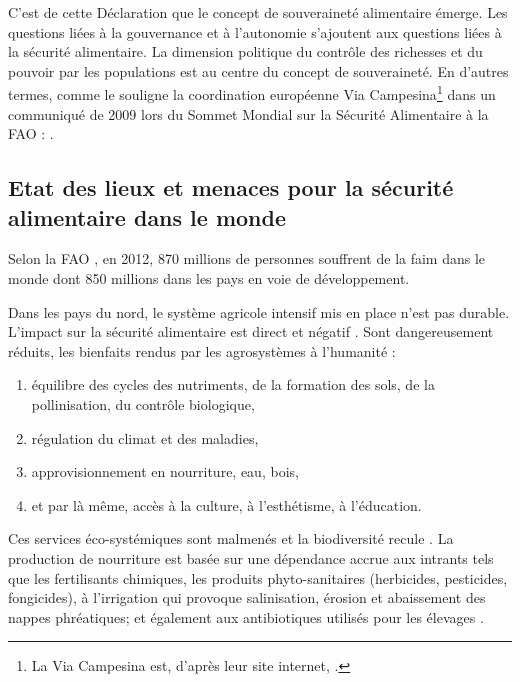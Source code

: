 C'est de cette Déclaration que le concept de souveraineté alimentaire émerge.
Les questions liées à la gouvernance et à l'autonomie s'ajoutent aux questions liées à la sécurité alimentaire.
La dimension politique du contrôle des richesses et du pouvoir par les populations est au centre du concept de souveraineté.
En d'autres termes, comme le souligne la coordination européenne Via Campesina\footnote{
La Via Campesina est, d'après leur site internet, .} dans un communiqué de 2009 lors du Sommet Mondial sur la Sécurité Alimentaire à la FAO :
.


\subsection{Etat des lieux et menaces pour la sécurité alimentaire dans le monde}
Selon la FAO \cite{fao_letat_2012}, en 2012, 870 millions de personnes souffrent de la faim dans le monde dont 850 millions dans les pays en voie de développement.

Dans les pays du nord, le système agricole intensif mis en place n'est pas durable.
L'impact sur la sécurité alimentaire est direct et négatif \cite{fao_biodiversity_2010,mea_ecosystems_2005,pimentel_environmental_2005,fao_statistical_2013,iaastd_agriculture_2008}.
Sont dangereusement réduits, les bienfaits rendus par les agrosystèmes à l'humanité : 
\begin{enumerate}
\item équilibre des cycles des nutriments, de la formation des sols, de la pollinisation, du contrôle biologique,
\item régulation du climat et des maladies,
\item approvisionnement en nourriture, eau, bois,
\item et par là même, accès à la culture, à l'esthétisme, à l'éducation. 
\end{enumerate}
Ces services éco-systémiques sont malmenés et la biodiversité recule \cite{mea_ecosystems_2005}.
La production de nourriture est basée sur une dépendance accrue aux intrants tels que les fertilisants chimiques, les produits phyto-sanitaires (herbicides, pesticides, fongicides), à l'irrigation qui provoque salinisation, érosion et abaissement des nappes phréatiques; et également aux antibiotiques utilisés pour les élevages \cite{fao_biodiversity_2010}.

